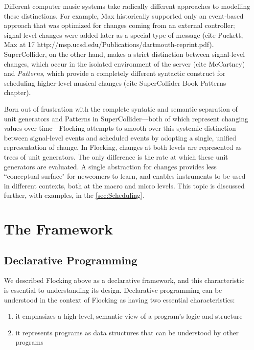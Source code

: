 \documentclass{article}
\begin{document}
Different computer music systems take radically different approaches to modelling these distinctions. For example, Max historically supported only an event-based approach that was optimized for changes coming from an external controller; signal-level changes were added later as a special type of message (cite Puckett, Max at 17 http://msp.ucsd.edu/Publications/dartmouth-reprint.pdf). SuperCollider, on the other hand, makes a strict distinction between signal-level changes, which occur in the isolated environment of the server (cite McCartney) and {\it Patterns}, which provide a completely different syntactic construct for scheduling higher-level musical changes (cite SuperCollider Book Patterns chapter).

Born out of frustration with the complete syntatic and semantic separation of unit generators and Patterns in SuperCollider---both of which represent changing values over time---Flocking attempts to smooth over this systemic distinction between signal-level events and scheduled events by adopting a single, unified representation of change. In Flocking, changes at both levels are represented as trees of unit generators. The only difference is the rate at which these unit generators are evaluated. A single abstraction for changes provides less ``conceptual surface" for newcomers to learn, and enables instruments to be used in different contexts, both at the macro and micro levels. This topic is discussed further, with examples, in the \ref{sec:Scheduling}.

\section{The Framework}

\subsection{Declarative Programming}
We described Flocking above as a declarative framework, and this characteristic is essential to understanding its design. Declarative programming can be understood in the context of Flocking as having two essential characteristics:

\begin{enumerate}
\item it emphasizes a high-level, semantic view of a program’s logic and structure
\item it represents programs as data structures that can be understood by other programs
\end{enumerate}
\end{document}
